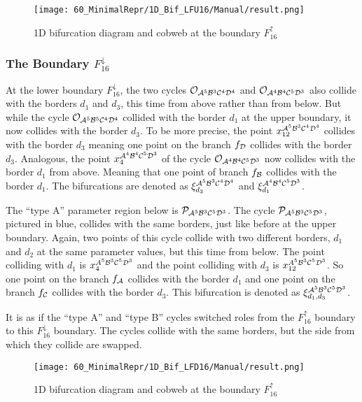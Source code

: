 \begin{figure}
    \centering
    \texttt{[image: 60\_MinimalRepr/1D\_Bif\_LFU16/Manual/result.png]}
    \label{fig:final.bifurcation.F.up}
    \caption{1D bifurcation diagram and cobweb at the boundary $F_{16}^\uparrow$}
\end{figure}

\subsubsection{The Boundary $F_{16}^\downarrow$}

At the lower boundary $F_{16}^\downarrow$, the two cycles $\mathcal{O}_{\mathcal{A}^5\mathcal{B}^3\mathcal{C}^4\mathcal{D}^4}$ and $\mathcal{O}_{\mathcal{A}^4\mathcal{B}^4\mathcal{C}^5\mathcal{D}^3}$ also collide with the borders $d_1$ and $d_3$, this time from above rather than from below.
But while the cycle $\mathcal{O}_{\mathcal{A}^5\mathcal{B}^5\mathcal{C}^4\mathcal{D}^4}$ collided with the border $d_1$ at the upper boundary, it now collides with the border $d_3$.
To be more precise, the point $x_{12}^{\mathcal{A}^5\mathcal{B}^3\mathcal{C}^4\mathcal{D}^4}$ collides with the border $d_3$ meaning one point on the branch $f_{\mathcal{D}}$ collides with the border $d_3$.
Analogous, the point $x_{4}^{\mathcal{A}^4\mathcal{B}^4\mathcal{C}^5\mathcal{D}^3}$ of the cycle $\mathcal{O}_{\mathcal{A}^4\mathcal{B}^4\mathcal{C}^5\mathcal{D}^3}$ now collides with the border $d_1$ from above.
Meaning that one point of branch $f_{\mathcal{B}}$ collides with the border $d_1$. The bifurcations are denoted as $\xi_{d_3}^{\mathcal{A}^5\mathcal{B}^3\mathcal{C}^4\mathcal{D}^4}$ and $\xi_{d_1}^{\mathcal{A}^4\mathcal{B}^4\mathcal{C}^5\mathcal{D}^3}$.

The ``type A'' parameter region below is $\mathcal{P}_{\mathcal{A}^5\mathcal{B}^3\mathcal{C}^5\mathcal{D}^3}$.
The cycle $\mathcal{P}_{\mathcal{A}^5\mathcal{B}^3\mathcal{C}^5\mathcal{D}^3}$, pictured in blue, collides with the same borders, just like before at the upper boundary.
Again, two points of this cycle collide with two different borders, $d_1$ and $d_2$ at the same parameter values, but this time from below.
The point colliding with $d_1$ is $x_{4}^{A^5\mathcal{B}^3\mathcal{C}^5\mathcal{D}^3}$ and  the point colliding with $d_3$ is $x_{12}^{A^5\mathcal{B}^3\mathcal{C}^5\mathcal{D}^3}$.
So one point on the branch $f_{\mathcal{A}}$ collides with the border $d_1$ and one point on the branch $f_{\mathcal{C}}$ collides with the border $d_3$.
This bifurcation is denoted as $\xi_{d_1, d_3}^{\mathcal{A}^5\mathcal{B}^3\mathcal{C}^5\mathcal{D}^3}$.

It is as if the ``type A'' and ``type B'' cycles switched roles from the $F_{16}^\uparrow$ boundary to this $F_{16}^\downarrow$ boundary.
The cycles collide with the same borders, but the side from which they collide are swapped.

\begin{figure}
    \centering
    \texttt{[image: 60\_MinimalRepr/1D\_Bif\_LFD16/Manual/result.png]}
    \label{fig:final.bifurcation.F.down}
    \caption{1D bifurcation diagram and cobweb at the boundary $F_{16}^\uparrow$}
\end{figure}

